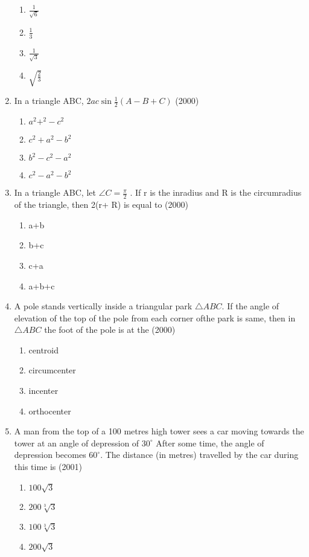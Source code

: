 \documentclass[12pt]{article}
\begin{document}
\begin{enumerate}
\begin{enumerate}
\item $\frac{1}{\sqrt{6}}$
\item $\frac{1}{3}$
\item $\frac{1}{\sqrt{3}}$
\item $\sqrt{\frac{2}{3}}$
\end{enumerate}
\item  In a triangle ABC, $2ac\sin\frac{1}{2}(A-B+C)$ (2000)
\begin{enumerate}
\item $a^2+^2-c^2$
\item $c^2+a^2-b^2$
\item $b^2-c^2-a^2$
\item $c^2-a^2-b^2$
\end{enumerate}
\item  In a triangle ABC, let $\angle C=\frac{\pi}{2}$ . If r is the inradius and R is the circumradius of the triangle, then 2(r+ R) is equal to (2000)
\begin{enumerate}
\item a+b
\item b+c
\item c+a
\item a+b+c
\end{enumerate}
\item A pole stands vertically inside a triangular park $\triangle ABC$. If the angle of elevation of the top of the pole from each corner ofthe park is same, then in $\triangle ABC$ the foot of the pole is at the (2000)
\begin{enumerate}
\item centroid
\item circumcenter
\item incenter
\item orthocenter
\end{enumerate}
\item A man from the top of a 100 metres high tower sees a car moving towards the tower at an angle of depression of $30^\circ$ After some time, the angle of depression becomes $60^\circ$. The distance (in metres) travelled by the car during this time is (2001)
\begin{enumerate}
\item $100\sqrt{3}$
\item $200\sqrt[3]{3}$
\item $100\sqrt[3]{3}$
\item $200\sqrt{3}$
\end{enumerate}

\end{enumerate}
\end{document}
